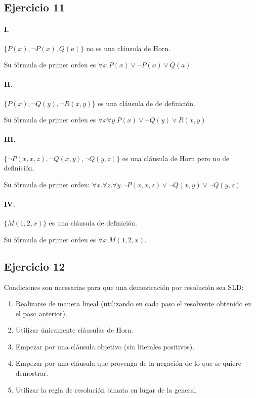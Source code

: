 \documentclass[10pt,a4paper]{article}
\begin{document}
\subsection{Ejercicio 11}
\paragraph{I.} $\{P(x), \lnot P(x), Q(a)\}$ no es una cláusula de Horn. 

Su fórmula de primer orden es $\forall x.P(x)\lor \lnot P(x)\lor Q(a)$.

\paragraph{II.} $\{P(x), \lnot Q(y), \lnot R(x,y) \}$ es una cláusula de de definición.

Su fórmula de primer orden es $\forall x\forall y.P(x) \lor \lnot Q(y) \lor R(x,y)$

\paragraph{III.} $\{\lnot P(x,x,z), \lnot Q(x,y), \lnot Q(y,z) \}$ es una cláusula de Horn pero no de definición.

Su fórmula de primer orden: $\forall x.\forall z.\forall y. \lnot P(x,x,z) \lor \lnot Q(x,y) \lor \lnot Q(y,z)$
\paragraph{IV.} $\{M(1,2,x) \}$ es una cláusula de definición.

Su fórmula de primer orden es $\forall x. M(1,2,x)$.

\subsection{Ejercicio 12}
    Condiciones son necesarias para que una demostración por resolución sea SLD:
    \begin{enumerate}
        \item Realizarse de manera lineal (utilizando en cada paso el resolvente obtenido en el paso anterior).
        \item Utilizar únicamente cláusulas de Horn.
        \item Empezar por una cláusula objetivo (sin literales positivos).
        \item Empezar por una cláusula que provenga de la negación de lo que se quiere demostrar.
        \item Utilizar la regla de resolución binaria en lugar de la general.
    \end{enumerate}
\end{document}

